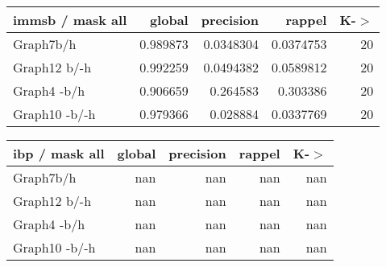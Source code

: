 \begin{table*} 
	\begin{minipage}[h]{0.45\linewidth} 
\begin{tabular}{lrrrr}
\hline
 immsb / mask all   &   global &   precision &    rappel &   K-\ensuremath{>} \\
\hline
 Graph7b/h          & 0.989873 &   0.0348304 & 0.0374753 &    20 \\
 Graph12 b/-h       & 0.992259 &   0.0494382 & 0.0589812 &    20 \\
 Graph4 -b/h        & 0.906659 &   0.264583  & 0.303386  &    20 \\
 Graph10 -b/-h      & 0.979366 &   0.028884  & 0.0337769 &    20 \\
\hline
\end{tabular}
\end{minipage}
\hspace{0.5cm}
\begin{minipage}[h]{0.45\linewidth}
\begin{tabular}{lrrrr}
\hline
 ibp / mask all   &   global &   precision &   rappel &   K-\ensuremath{>} \\
\hline
 Graph7b/h        &      nan &         nan &      nan &   nan \\
 Graph12 b/-h     &      nan &         nan &      nan &   nan \\
 Graph4 -b/h      &      nan &         nan &      nan &   nan \\
 Graph10 -b/-h    &      nan &         nan &      nan &   nan \\
\hline
\end{tabular}
\end{minipage}
\end{table*}




